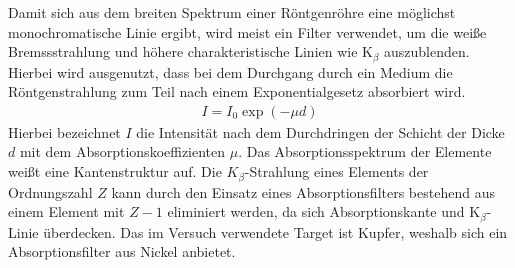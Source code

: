 \documentclass[a4paper,twoside,final]{article}
\begin{document}
Damit sich aus dem breiten Spektrum einer Röntgenröhre eine möglichst monochromatische Linie ergibt, wird meist ein Filter verwendet, um die weiße Bremssstrahlung und höhere charakteristische Linien wie K$_\beta$ auszublenden. Hierbei wird ausgenutzt, dass bei dem Durchgang durch ein Medium die Röntgenstrahlung zum Teil nach einem Exponentialgesetz absorbiert wird.
\begin{align}
  I = I_0 \exp(-\mu d)
\end{align}
Hierbei bezeichnet $I$ die Intensität nach dem Durchdringen der Schicht der Dicke $d$ mit dem Absorptionskoeffizienten $\mu$. Das Absorptionsspektrum der Elemente weißt eine Kantenstruktur auf. Die $K_\beta$-Strahlung eines Elements der Ordnungszahl $Z$ kann durch den Einsatz eines Absorptionsfilters bestehend aus einem Element mit $Z-1$ eliminiert werden, da sich Absorptionskante und K$_\beta$-Linie überdecken. Das im Versuch verwendete Target ist Kupfer, weshalb sich ein Absorptionsfilter aus Nickel anbietet.
\end{document}
